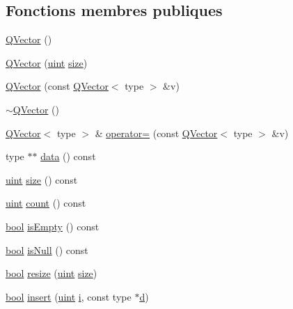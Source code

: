 \subsection*{Fonctions membres publiques}
\begin{DoxyCompactItemize}
\item 
\hyperlink{class_q_vector_a09cea8996593eb3d818f12e89771b506}{Q\+Vector} ()
\item 
\hyperlink{class_q_vector_a00272033a3dbacb138c52276ac6a88d1}{Q\+Vector} (\hyperlink{qglobal_8h_a4d3943ddea65db7163a58e6c7e8df95a}{uint} \hyperlink{class_q_vector_adfef14e7d63f9f4fa10d5f9b1359be62}{size})
\item 
\hyperlink{class_q_vector_a641d2525bcf81ac885b2a4b494b64f2d}{Q\+Vector} (const \hyperlink{class_q_vector}{Q\+Vector}$<$ type $>$ \&v)
\item 
\hyperlink{class_q_vector_a08f6f21568864b312b782d8f66ed26aa}{$\sim$\+Q\+Vector} ()
\item 
\hyperlink{class_q_vector}{Q\+Vector}$<$ type $>$ \& \hyperlink{class_q_vector_a07a47bb985bb86befdf9da8abe82b949}{operator=} (const \hyperlink{class_q_vector}{Q\+Vector}$<$ type $>$ \&v)
\item 
type $\ast$$\ast$ \hyperlink{class_q_vector_abc01413e6d3d8a289f522dab8d04db03}{data} () const 
\item 
\hyperlink{qglobal_8h_a4d3943ddea65db7163a58e6c7e8df95a}{uint} \hyperlink{class_q_vector_adfef14e7d63f9f4fa10d5f9b1359be62}{size} () const 
\item 
\hyperlink{qglobal_8h_a4d3943ddea65db7163a58e6c7e8df95a}{uint} \hyperlink{class_q_vector_a8059b871346b4b3b42af6a055c6fe70a}{count} () const 
\item 
\hyperlink{qglobal_8h_a1062901a7428fdd9c7f180f5e01ea056}{bool} \hyperlink{class_q_vector_add1d67330d1b2a01f5b93ab6b922978b}{is\+Empty} () const 
\item 
\hyperlink{qglobal_8h_a1062901a7428fdd9c7f180f5e01ea056}{bool} \hyperlink{class_q_vector_af154a27b5a51f96b4d4ea7c656d6f7bf}{is\+Null} () const 
\item 
\hyperlink{qglobal_8h_a1062901a7428fdd9c7f180f5e01ea056}{bool} \hyperlink{class_q_vector_aa19a2610fbe7a0e39bef980974398d37}{resize} (\hyperlink{qglobal_8h_a4d3943ddea65db7163a58e6c7e8df95a}{uint} \hyperlink{class_q_vector_adfef14e7d63f9f4fa10d5f9b1359be62}{size})
\item 
\hyperlink{qglobal_8h_a1062901a7428fdd9c7f180f5e01ea056}{bool} \hyperlink{class_q_vector_a659efd64c0ccb0a06f2d1dc04f5f2b79}{insert} (\hyperlink{qglobal_8h_a4d3943ddea65db7163a58e6c7e8df95a}{uint} \hyperlink{060__command__switch_8tcl_a8c90afd4641b25be86bd09983c3cbee0}{i}, const type $\ast$\hyperlink{060__command__switch_8tcl_af43f4b1f0064a33b2d662af9f06d3a00}{d})
$$
\end{DoxyCompactItemize}
